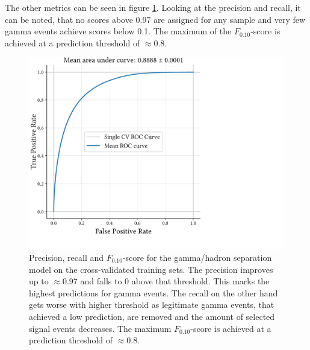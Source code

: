The other metrics can be seen in figure \ref{fig:gh_scores}.
Looking at the precision and recall, it can be noted, that no scores above 0.97 are assigned
for any sample and very few gamma events achieve scores below \num{0.1}.
The maximum of the $F_{\num{0.10}}$-score is achieved at a prediction
threshold of $\approx \num{0.8}$.

\begin{figure}
    \centering
    \captionsetup{width=0.9\textwidth}
    \includegraphics[page=3, width=.6\textwidth]{../analysis/plots/cross_val_sep_perf_plot.pdf}
    \caption{Precision, recall and $F_{\num{0.10}}$-score for the gamma/hadron separation model on the 
    cross-validated training sets.
    The precision improves up
    to $\approx \num{0.97}$ and falls to 0 above that threshold.
    This marks the highest predictions for gamma events.
    The recall on the other hand gets worse with higher threshold as legitimate gamma events,
    that achieved a low prediction, are removed and the amount of selected signal events decreases.
    The maximum $F_{\num{0.10}}$-score is achieved at a prediction threshold
    of $\approx \num{0.8}$.}
    \label{fig:gh_scores}
\end{figure}





